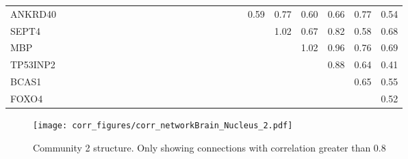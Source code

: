 \begin{longtable}{lrrrrrrrrrrrrrrrrrrrrrrrrr}
ANKRD40  &              &            &            &            &            &             &               &            &             &              &             &              &             &                &            &            &                &             &               &        0.59 &      0.77 &           0.60 &        0.66 &        0.77 &          0.54 \\
SEPT4    &              &            &            &            &            &             &               &            &             &              &             &              &             &                &            &            &                &             &               &             &      1.02 &           0.67 &        0.82 &        0.58 &          0.68 \\
MBP      &              &            &            &            &            &             &               &            &             &              &             &              &             &                &            &            &                &             &               &             &           &           1.02 &        0.96 &        0.76 &          0.69 \\
TP53INP2 &              &            &            &            &            &             &               &            &             &              &             &              &             &                &            &            &                &             &               &             &           &                &        0.88 &        0.64 &          0.41 \\
BCAS1    &              &            &            &            &            &             &               &            &             &              &             &              &             &                &            &            &                &             &               &             &           &                &             &        0.65 &          0.55 \\
FOXO4    &              &            &            &            &            &             &               &            &             &              &             &              &             &                &            &            &                &             &               &             &           &                &             &             &          0.52 \\
\end{longtable}


\begin{figure}[h!]
\centering
\texttt{[image: corr\_figures/corr\_networkBrain\_Nucleus\_2.pdf]}
\caption{Community 2 structure. Only showing connections with correlation greater than 0.8}
\end{figure}




